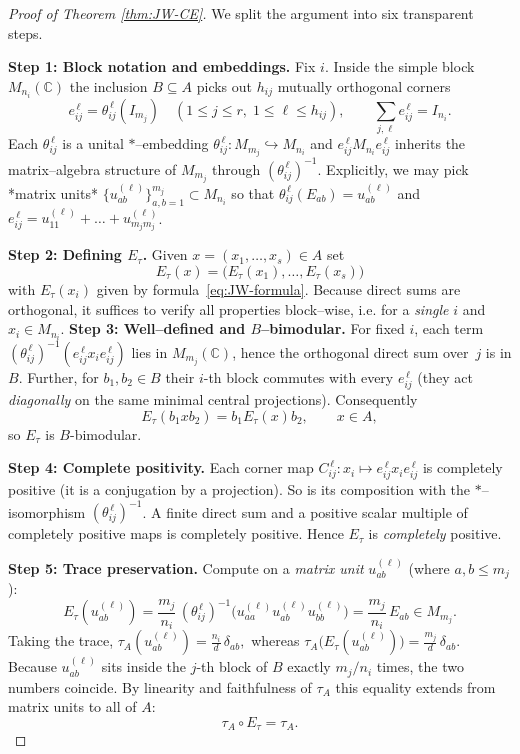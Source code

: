 \documentclass[11pt]{article}
\theoremstyle{mytheoremstyle}
\theoremstyle{definition}
\theoremstyle{remark}
\begin{document}
\begin{proof}[Proof of Theorem \ref{thm:JW-CE}]
We split the argument into six transparent steps.

\medskip
\noindent\textbf{Step 1: Block notation and embeddings.} Fix $i$.
Inside the simple block $M_{n_i}(\mathbb{C})$ the inclusion
$B\subseteq A$ picks out
$h_{ij}$ mutually orthogonal corners
\[
   e_{ij}^{\,\ell}= \theta_{ij}^{\,\ell}(I_{m_j}) 
   \quad
   (1\le j\le r,\;1\le \ell\le h_{ij}),
   \qquad
   \sum_{j,\ell}e_{ij}^{\,\ell}=I_{n_i}.
\]
Each $\theta_{ij}^{\,\ell}$ is a unital $\ast$–embedding
\(
   \theta_{ij}^{\,\ell}:M_{m_j}\hookrightarrow M_{n_i}
\)
and
\(e_{ij}^{\,\ell}M_{n_i}e_{ij}^{\,\ell}\)
inherits the matrix–algebra structure of $M_{m_j}$ through
\((\theta_{ij}^{\,\ell})^{-1}\). 
Explicitly, we may pick *matrix units* \(
  \{u^{(\ell)}_{ab}\}_{a,b=1}^{m_j}
\subset M_{n_i}
\)
so that
$\theta_{ij}^{\,\ell}(E_{ab})=u_{ab}^{(\ell)}$
and
$e_{ij}^{\,\ell}=u^{(\ell)}_{11}+\dots+u^{(\ell)}_{m_jm_j}$.

\medskip
\noindent\textbf{Step 2: Defining $E_\tau$.} Given $x=(x_1,\dots,x_s)\in A$ set
\[
   E_\tau(x)=\bigl( E_\tau(x_1),\dots,E_\tau(x_s)\bigr)
\]
with $E_\tau(x_i)$ given by formula~\eqref{eq:JW-formula}.
Because direct sums are orthogonal, it suffices to verify all properties
block–wise, i.e. for a \emph{single} $i$ and $x_i\in M_{n_i}$.
\medskip
\noindent\textbf{Step 3: Well–defined and $B$–bimodular.} For fixed $i$, each term
\(
  (\theta_{ij}^{\,\ell})^{-1}(e_{ij}^{\,\ell}x_ie_{ij}^{\,\ell})
\)
lies in $M_{m_j}(\mathbb{C})$,
hence the orthogonal direct sum
over~$j$ is in $B$.
Further, for $b_1,b_2\in B$ their $i$-th block
commutes with every $e_{ij}^{\,\ell}$ (they act \emph{diagonally} on the same
minimal central projections).  Consequently
\[
   E_\tau(b_1x b_2)=b_1E_\tau(x)b_2,
   \qquad
   x\in A,
\]
so $E_\tau$ is $B$-bimodular.

\medskip
\noindent\textbf{Step 4: Complete positivity.} Each corner map
\(
   C_{ij}^{\,\ell}:x_i\mapsto e_{ij}^{\,\ell}x_ie_{ij}^{\,\ell}
\)
is completely positive (it is a conjugation by a projection).
So is its composition with the $*$–isomorphism
\((\theta_{ij}^{\,\ell})^{-1}\). 
A finite direct sum and a positive scalar multiple of completely positive
maps is completely positive.
Hence $E_\tau$ is \emph{completely} positive.

\medskip
\noindent\textbf{Step 5: Trace preservation.} Compute on a \emph{matrix unit} $u_{ab}^{(\ell)}$ (where $a,b\le m_j$):
\[
   E_\tau(u_{ab}^{(\ell)}) = \frac{m_j}{n_i}\, 
     (\theta_{ij}^{\,\ell})^{-1}
     \!\bigl(u_{aa}^{(\ell)}u_{ab}^{(\ell)}u_{bb}^{(\ell)}\bigr)
   =\frac{m_j}{n_i}\,E_{ab}\in M_{m_j}.
\]
Taking the trace,
\(
   \tau_A(u_{ab}^{(\ell)}) = \frac{n_i}{d}\,\delta_{ab},
\)
whereas
\( 
   \tau_A\!\bigl(E_\tau(u_{ab}^{(\ell)})\bigr) = \frac{m_j}{d}\,\delta_{ab}.
\)
Because $u^{(\ell)}_{ab}$ sits inside the $j$-th block of $B$ exactly
\(m_j/n_i\) times, the two numbers coincide.
By linearity and faithfulness of $\tau_A$
this equality extends from matrix units to all of $A$:
\[
   \tau_A\circ E_\tau=\tau_A.
\]


\end{proof}
\end{document}
